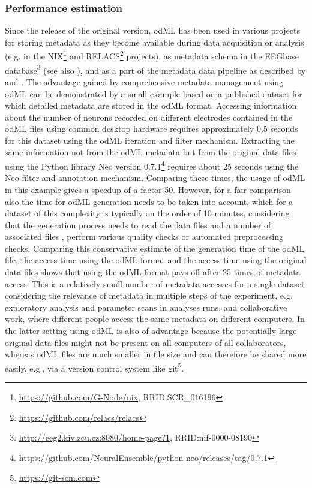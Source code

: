 \subsubsection{Performance estimation}
Since the release of the original version, odML has been used in various projects for storing metadata as they become available during data acquisition or analysis (e.g. in the NIX\footnote{\url{https://github.com/G-Node/nix}, RRID:SCR\_016196} and RELACS\footnote{\url{https://github.com/relacs/relacs}} projects), as metadata schema in the EEGbase database\footnote{\url{http://eeg2.kiv.zcu.cz:8080/home-page?1}, RRID:nif-0000-08190} (see also \citealp{Moucek_2014}), and as a part of the metadata data pipeline as described by \cite{Zehl_2016} and \cite{Brochier_2018}. The advantage gained by comprehensive metadata management using odML can be demonstrated by a small example based on a published dataset \citep{Brochier_2018} for which detailed metadata are stored in the odML format. Accessing information about the number of neurons recorded on different electrodes contained in the odML files using common desktop hardware requires approximately 0.5 seconds for this dataset using the odML iteration and filter mechanism. Extracting the same information not from the odML metadata but from the original data files using the Python library Neo version 0.7.1\footnote{\url{https://github.com/NeuralEnsemble/python-neo/releases/tag/0.7.1}} requires about 25 seconds using the Neo filter and annotation mechanism. Comparing these times, the usage of odML in this example gives a speedup of a factor 50. However, for a fair comparison also the time for odML generation needs to be taken into account, which for a dataset of this complexity is typically on the order of 10 minutes, considering that the generation process needs to read the data files and a number of associated files \citep{Zehl_2016}, perform various quality checks or automated preprocessing checks. Comparing this conservative estimate of the generation time of the odML file, the access time using the odML format and the access time using the original data files shows that using the odML format pays off after 25 times of metadata access. This is a relatively small number of metadata accesses for a single dataset considering the relevance of metadata in multiple steps of the experiment, e.g. exploratory analysis and parameter scans in analyses runs, and collaborative work, where different people access the same metadata on different computers. In the latter setting using odML is also of advantage because the potentially large original data files might not be present on all computers of all collaborators, whereas odML files are much smaller in file size and can therefore be shared more easily, e.g., via a version control system like git\footnote{\url{https://git-scm.com}}.

